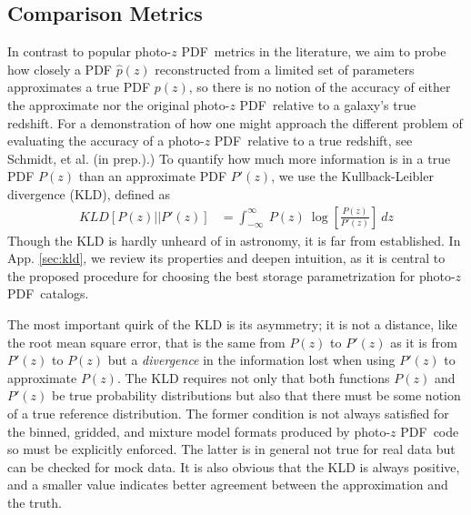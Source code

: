 \documentclass[\docopts]{\docclass}
\newcommand{\pz}{photo-$z$ PDF}
\begin{document}
\subsection{Comparison Metrics}
\label{sec:metric}


In contrast to popular \pz\ metrics in the literature, we aim to probe how 
closely a PDF $\hat{p}(z)$ reconstructed from a limited set of parameters 
approximates a true PDF $p(z)$, so there is no notion of the accuracy of either 
the approximate nor the original \pz\ relative to a galaxy's true redshift.  
For a demonstration of how one might approach the different problem of 
evaluating the accuracy of a \pz\ relative to a true redshift, see Schmidt, et 
al. (in prep.).)  To quantify how much more information is in a true PDF $P(z)$ 
than an approximate PDF $P'(z)$, we use the Kullback-Leibler divergence (KLD), 
defined as
\begin{align}
  \label{eq:kld}
  KLD[P(z) || P'(z)] &= \int_{-\infty}^{\infty}\ P(z)\ 
\log\left[\frac{P(z)}{P'(z)}\right]\ dz
\end{align}
Though the KLD is hardly unheard of in astronomy, it is far from established.  
In App. \ref{sec:kld}, we review its properties and deepen intuition, as it is 
central to the proposed procedure for choosing the best storage parametrization 
for \pz\ catalogs.

The most important quirk of the KLD is its asymmetry; it is not a distance, 
like the root mean square error, that is the same from $P(z)$ to $P'(z)$ as it 
is from $P'(z)$ to $P(z)$ but a \textit{divergence} in the information lost 
when using $P'(z)$ to approximate $P(z)$.  The KLD requires not only that both 
functions $P(z)$ and $P'(z)$ be true probability distributions but also that 
there must be some notion of a true reference distribution.  The former 
condition is not always satisfied for the binned, gridded, and mixture model 
formats produced by \pz\ code so must be explicitly enforced.  The latter is in 
general not true for real data but can be checked for mock data.  It is also 
obvious that the KLD is always positive, and a smaller value indicates better 
agreement between the approximation and the truth.
\end{document}
